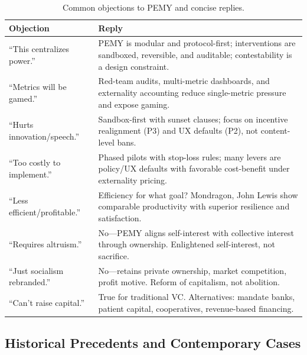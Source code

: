 \documentclass[11pt,a4paper]{article}
\theoremstyle{definition}
\theoremstyle{remark}
\begin{document}
\begin{table}[H]
\centering
\caption{Common objections to PEMY and concise replies.}
\label{tab:pemy_objections}
\renewcommand{\arraystretch}{1.15}
\begin{tabularx}{\linewidth}{@{}lX@{}}
\toprule
\textbf{Objection} & \textbf{Reply} \\
\midrule
``This centralizes power.'' &
PEMY is modular and protocol-first; interventions are sandboxed, reversible, and auditable; contestability is a design constraint. \\
``Metrics will be gamed.'' &
Red-team audits, multi-metric dashboards, and externality accounting reduce single-metric pressure and expose gaming. \\
``Hurts innovation/speech.'' &
Sandbox-first with sunset clauses; focus on incentive realignment (P3) and UX defaults (P2), not content-level bans. \\
``Too costly to implement.'' &
Phased pilots with stop-loss rules; many levers are policy/UX defaults with favorable cost-benefit under externality pricing. \\
``Less efficient/profitable.'' &
Efficiency for what goal? Mondragon, John Lewis show comparable productivity with superior resilience and satisfaction. \\
``Requires altruism.'' &
No---PEMY aligns self-interest with collective interest through ownership. Enlightened self-interest, not sacrifice. \\
``Just socialism rebranded.'' &
No---retains private ownership, market competition, profit motive. Reform of capitalism, not abolition. \\
``Can't raise capital.'' &
True for traditional VC. Alternatives: mandate banks, patient capital, cooperatives, revenue-based financing. \\
\bottomrule
\end{tabularx}
\end{table}

\subsection{Historical Precedents and Contemporary Cases}
\label{app:pemy_cases}
\end{document}
